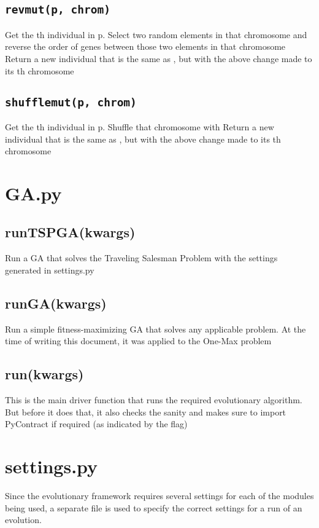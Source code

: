 \documentclass[letterpaper,10pt,english]{sphinxmanual}
\begin{document}
\section{\texttt{revmut(p, chrom)}}
\label{mutation.py:revmut-p-chrom}
Get the  th individual in p. Select two random elements in that chromosome and reverse the order of genes between those two elements in that chromosome
Return a new individual that is the same as , but with the above change made to its  th chromosome


\section{\texttt{shufflemut(p, chrom)}}
\label{mutation.py:shufflemut-p-chrom}
Get the  th individual in p. Shuffle that chromosome with 
Return a new individual that is the same as , but with the above change made to its  th chromosome


\chapter{GA.py}
\label{GA.py::doc}\label{GA.py:ga-py}

\section{runTSPGA(kwargs)}
\label{GA.py:runtspga-kwargs}
Run a GA that solves the Traveling Salesman Problem with the settings generated in settings.py


\section{runGA(kwargs)}
\label{GA.py:runga-kwargs}
Run a simple fitness-maximizing GA that solves any applicable problem. At the time of writing this document, it was applied to the One-Max problem


\section{run(kwargs)}
\label{GA.py:run-kwargs}
This is the main driver function that runs the required evolutionary algorithm. But before it does that, it also checks the sanity and makes sure to import PyContract if required (as indicated by the  flag)


\chapter{settings.py}
\label{settings.py:settings-py}\label{settings.py::doc}
Since the evolutionary framework requires several settings for each of the modules being used, a separate file is used to specify the correct settings for a run of an evolution.
\end{document}
